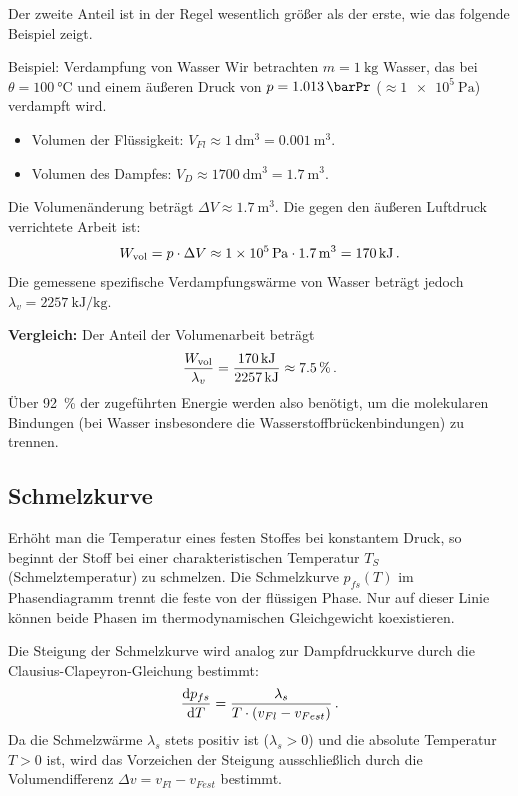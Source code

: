 Der zweite Anteil ist in der Regel wesentlich größer als der erste, wie das folgende Beispiel zeigt.

\begin{examplebox}{Beispiel: Verdampfung von Wasser}
    Wir betrachten $m = \SI{1}{\kilogram}$ Wasser, das bei $\theta = \SI{100}{\celsius}$ und einem äußeren Druck von $p = \SI{1.013}{\barPr}$ ($\approx \SI{1e5}{\pascal}$) verdampft wird.
    \begin{itemize}
        \item Volumen der Flüssigkeit: $V_{Fl} \approx \SI{1}{\deci\meter\cubed} = \SI{0.001}{\cubic\meter}$.
        \item Volumen des Dampfes: $V_D \approx \SI{1700}{\deci\meter\cubed} = \SI{1.7}{\cubic\meter}$.
    \end{itemize}
    Die Volumenänderung beträgt $\Delta V \approx \SI{1.7}{\cubic\meter}$. Die gegen den äußeren Luftdruck verrichtete Arbeit ist:
    \begin{equation}
        W_{\text{vol}} = p \cdot \Delta V \approx \SI{1e5}{\pascal} \cdot \SI{1.7}{\cubic\meter} = \SI{170}{\kilo\joule} \,.
    \end{equation}
    Die gemessene spezifische Verdampfungswärme von Wasser beträgt jedoch $\lambda_v = \SI{2257}{\kilo\joule\per\kilogram}$.
    
    \textbf{Vergleich:} Der Anteil der Volumenarbeit beträgt
    \begin{equation}
        \frac{W_{\text{vol}}}{\lambda_v} = \frac{\SI{170}{\kilo\joule}}{\SI{2257}{\kilo\joule}} \approx \SI{7.5}{\percent} \,.
    \end{equation}
    Über \SI{92}{\percent} der zugeführten Energie werden also benötigt, um die molekularen Bindungen (bei Wasser insbesondere die Wasserstoffbrückenbindungen) zu trennen.
\end{examplebox}

\subsection{Schmelzkurve}\label{subsec: schmelzkurve}
Erhöht man die Temperatur eines festen Stoffes bei konstantem Druck, so beginnt der Stoff bei einer charakteristischen Temperatur $T_S$ (Schmelztemperatur) zu schmelzen. Die Schmelzkurve $p_{fs}(T)$ im Phasendiagramm trennt die feste von der flüssigen Phase. Nur auf dieser Linie können beide Phasen im thermodynamischen Gleichgewicht koexistieren.

Die Steigung der Schmelzkurve wird analog zur Dampfdruckkurve durch die Clausius-Clapeyron-Gleichung bestimmt:
\begin{equation}\label{eq: clausius_clapeyron_schmelzen}
    \frac{\mathrm{d} p_{fs}}{\mathrm{d} T} = \frac{\lambda_s}{T \cdot (v_{Fl} - v_{Fest})} \,.
\end{equation}
Da die Schmelzwärme $\lambda_s$ stets positiv ist ($\lambda_s > 0$) und die absolute Temperatur $T > 0$ ist, wird das Vorzeichen der Steigung ausschließlich durch die Volumendifferenz $\Delta v = v_{Fl} - v_{Fest}$ bestimmt.

